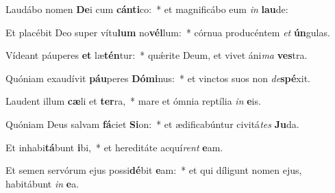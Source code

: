 \item Laudábo nomen \textbf{De}i cum \textbf{cán}\textbf{ti}co:~* et magnificábo eum \textit{in} \textbf{lau}de:
\item Et placébit Deo super vítu\textbf{lum} no\textbf{vél}lum:~* córnua producéntem \textit{et} \textbf{ún}gulas.
\item Vídeant páuperes \textbf{et} læ\textbf{tén}tur:~* quǽrite Deum, et vivet áni\textit{ma} \textbf{ves}tra.
\item Quóniam exaudívit \textbf{páu}peres \textbf{Dó}\textbf{mi}nus:~* et vinctos suos non \textit{de}\textbf{spé}xit.
\item Laudent illum \textbf{cæ}li et \textbf{ter}ra,~* mare et ómnia reptília \textit{in} \textbf{e}is.
\item Quóniam Deus salvam \textbf{fá}ciet \textbf{Si}on:~* et ædificabúntur civitá\textit{tes} \textbf{Ju}da.
\item Et inhabi\textbf{tá}bunt \textbf{i}bi,~* et hereditáte acquí\textit{rent} \textbf{e}am.
\item Et semen servórum ejus possi\textbf{dé}bit \textbf{e}am:~* et qui díligunt nomen ejus, habitábunt \textit{in} \textbf{e}a.
